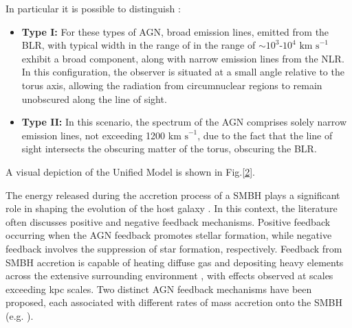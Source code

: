 In particular it is possible to distinguish :
 
\begin{itemize}
  \item \textbf{Type I:} For these types of AGN, broad emission lines, emitted from the BLR, with typical width in the range of in the range of $\sim 10^{3}$-$10^{4}$ $\text{km s}^{-1}$ exhibit a broad component,  along with narrow emission lines from the NLR. In this configuration, the observer is situated at a small angle relative to the torus axis, allowing the radiation from circumnuclear regions to remain unobscured along the line of sight.
  
  \item \textbf{Type II:} In this scenario, the spectrum of the AGN comprises solely narrow emission lines, not exceeding 1200 $  \text{km s}^{-1}$, due to the fact that the line of sight intersects the obscuring matter of the torus, obscuring the BLR.
  
\end{itemize}
A visual depiction of the Unified Model is shown in Fig.\ref{2}.

The energy released during the accretion process of a SMBH plays a significant role in shaping the evolution of the host galaxy \cite{2021A&A...646A.167M}. In this context, the literature often discusses positive and negative feedback mechanisms.
Positive feedback occurring when the AGN feedback promotes stellar formation, while negative feedback involves the suppression of star formation, respectively. Feedback from SMBH accretion is capable of heating diffuse gas \cite{2005Natur.433..604D} and depositing heavy elements across the extensive surrounding environment \cite{2000ApJ...539L..13G}, with effects observed at scales exceeding kpc scales. Two distinct AGN feedback mechanisms have been proposed, each associated with different rates of mass accretion onto the SMBH (e.g. \cite{2012ARA&A..50..455F, 2017NatAs...1E.165H}).

